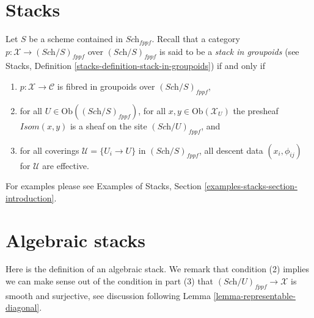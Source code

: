 \section{Stacks}
\label{section-stacks}

\noindent
Let $S$ be a scheme contained in $\textit{Sch}_{fppf}$.
Recall that a category $p : \mathcal{X} \to (\textit{Sch}/S)_{fppf}$
over $(\textit{Sch}/S)_{fppf}$ is said to be a
{\it stack in groupoids} (see
Stacks, Definition \ref{stacks-definition-stack-in-groupoids})
if and only if
\begin{enumerate}
\item $p : \mathcal{X} \to \mathcal{C}$ is fibred
in groupoids over $(\textit{Sch}/S)_{fppf}$,
\item for all $U \in \text{Ob}((\textit{Sch}/S)_{fppf})$,
for all $x, y\in \text{Ob}(\mathcal{X}_U)$ the presheaf
$\mathit{Isom}(x, y)$ is a sheaf on the site $(\textit{Sch}/U)_{fppf}$, and
\item for all coverings $\mathcal{U} = \{U_i \to U\}$ in
$(\textit{Sch}/S)_{fppf}$, all descent data $(x_i, \phi_{ij})$
for $\mathcal{U}$ are effective.
\end{enumerate}
For examples please see
Examples of Stacks, Section \ref{examples-stacks-section-introduction}.










\section{Algebraic stacks}
\label{section-algebraic-stacks}

\noindent
Here is the definition of an algebraic stack. We remark that condition
(2) implies we can make sense out of the condition in part (3) that
$(\textit{Sch}/U)_{fppf} \to \mathcal{X}$
is smooth and surjective, see discussion following
Lemma \ref{lemma-representable-diagonal}.

